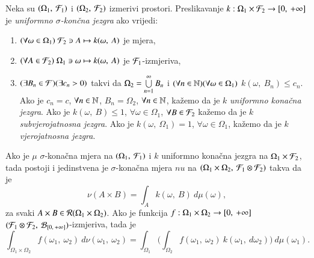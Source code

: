 \begin{defn}    \label{defn:4.17}
    Neka su $({\Omega_1}, \: {\mathcal{F}_1})$ i $({\Omega_2}, \: {\mathcal{F}_2})$ izmerivi prostori. Preslikavanje $k : \Omega_1 \times \mathcal{F}_2 \to [{0}, \:{+\infty}]$ je \emph{uniformno $\sigma$-kon\v cna jezgra} ako vrijedi:
    \begin{enumerate}[label=(\alph*)]
        \item $(\forall \omega \in \Omega_1 ) \; \mathcal{F}_2 \ni A \mapsto k(\omega, \: A)$ je mjera,
        \item $(\forall A \in \mathcal{F}_2 ) \; \Omega_1 \ni \omega \mapsto k(\omega, \: A)$ je $\mathcal{F}_1$-izmjeriva,
        \item $(\exists B_n \in \mathcal{F})(\exists c_n > 0)$ takvi da $\Omega_2 = \bigcup\limits_{n = 1}^{\infty} B_n$ i $(\forall n \in \mathbb{N})(\forall \omega \in \Omega_1)$ $k(\omega, \: B_n) \leq c_n$.\\
        Ako je $c_n = c$, $\forall n \in \mathbb{N}$, $B_n = \Omega_2$, $\forall n \in \mathbb{N}$, ka\v zemo da je $k$ \emph{uniformno kona\v cna jezgra}. Ako je $k(\omega, \: B) \leq 1$, $\forall \omega \in \Omega_1$, $\forall B \in \mathcal{F}_2$ ka\v zemo da je $k$ \emph{subvjerojatnosna jezgra}. Ako je $k(\omega, \: \Omega_1) = 1$, $\forall \omega \in \Omega_1$, ka\v zemo da je $k$ \emph{vjerojatnosna jezgra}.
    \end{enumerate}
\end{defn}

\begin{zad} \label{zad:4.18}
    Ako je $\mu$ $\sigma$-kona\v cna mjera na $({\Omega_1}, \: {\mathcal{F}_1})$ i $k$ uniformno kona\v cna jezgra na $\Omega_1 \times \mathcal{F}_2$, tada postoji i jedinstvena je $\sigma$-kona\v cna mjera $nu$ na $({\Omega_1 \times \Omega_2}, \: {\mathcal{F}_1 \otimes \mathcal{F}_2})$ takva da je
    \begin{equation*}
        \nu (A \times B) = \int_A k(\omega, \: B) \: d \mu (\omega),
    \end{equation*}
    za svaki $A \times B \in \mathcal{R}({\Omega_1 \times \Omega_2})$.
    Ako je funkcija $f:\Omega_1 \times \Omega_2 \to [{0}, \:{+\infty}]$ $({\mathcal{F}_1 \otimes \mathcal{F}_2}, \: {\mathcal{B}_{[{0}, \:{+\infty}]}})$-izmjeriva, tada je
    \begin{equation*}
        \int_{\Omega_1 \times \Omega_2} f(\omega_1, \: \omega_2) \: d \nu (\omega_1, \: \omega_2) = \int_{\Omega_1} \Big( \int_{\Omega_2} f(\omega_1, \: \omega_2) \: k(\omega_1, \: d \omega_2) \Big) \: d \mu (\omega_1).
    \end{equation*}
\end{zad}

